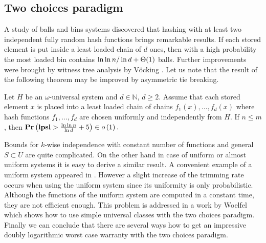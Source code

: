 \subsection{Two choices paradigm}
A study \cite{DBLP:conf/stoc/AzarBKU94} of balls and bins systems discovered that hashing with at least two independent fully random hash functions brings remarkable results. 
If each stored element is put inside a least loaded chain of $d$ ones, then with a high probability the most loaded bin contains ${\ln \ln n}/\ln d + \mathrm{\Theta}(1)$ balls.
Further improvements were brought by witness tree analysis by Vöcking \cite{DBLP:journals/jacm/Vocking03}. 
Let us note that the result of the following theorem may be improved by asymmetric tie breaking.

\begin{theorem}
\label{theorem-universal-hashing-two-choices}
Let $H$ be an $\omega$-universal system and $d \in \mathbb{N}$, $d \geq 2$. Assume that each stored element $x$ is placed into a least loaded chain of chains $f_1(x), \dots, f_d(x)$ where hash functions $f_1, \dots, f_d$ are chosen uniformly and independently from $H$. If $n \leq m$, then $\mathbf{Pr}\left(\mathbf{lpsl} > \frac{\ln \ln n}{\ln d} + 5\right) \in o\left(1\right).$
\end{theorem}

Bounds for $k$-wise independence with constant number of functions and general $S \subset U$ are quite complicated.
On the other hand in case of uniform or almost uniform systems it is easy to derive a similar result.
A convenient example of a uniform system appeared in \cite{DBLP:journals/siamcomp/PaghP08}.
However a slight increase of the trimming rate occurs when using the uniform system since its uniformity is only probabilistic.
Although the functions of the uniform system are computed in a constant time, they are not efficient enough. 
This problem is addressed in a work by Woelfel \cite{InProc-Woe2006a} which shows how to use simple universal classes with the two choices paradigm.
Finally we can conclude that there are several ways how to get an impressive doubly logarithmic worst case warranty with the two choices paradigm.
